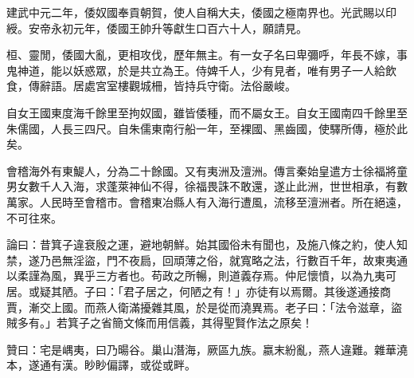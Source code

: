 \begin{pinyinscope}
建武中元二年，倭奴國奉貢朝賀，使人自稱大夫，倭國之極南界也。光武賜以印綬。安帝永初元年，倭國王帥升等獻生口百六十人，願請見。

桓、靈閒，倭國大亂，更相攻伐，歷年無主。有一女子名曰卑彌呼，年長不嫁，事鬼神道，能以妖惑眾，於是共立為王。侍婢千人，少有見者，唯有男子一人給飲食，傳辭語。居處宮室樓觀城柵，皆持兵守衛。法俗嚴峻。

自女王國東度海千餘里至拘奴國，雖皆倭種，而不屬女王。自女王國南四千餘里至朱儒國，人長三四尺。自朱儒東南行船一年，至裸國、黑齒國，使驛所傳，極於此矣。

會稽海外有東鯷人，分為二十餘國。又有夷洲及澶洲。傳言秦始皇遣方士徐福將童男女數千人入海，求蓬萊神仙不得，徐福畏誅不敢還，遂止此洲，世世相承，有數萬家。人民時至會稽市。會稽東冶縣人有入海行遭風，流移至澶洲者。所在絕遠，不可往來。

論曰：昔箕子違衰殷之運，避地朝鮮。始其國俗未有聞也，及施八條之約，使人知禁，遂乃邑無淫盜，門不夜扃，回頑薄之俗，就寬略之法，行數百千年，故東夷通以柔謹為風，異乎三方者也。苟政之所暢，則道義存焉。仲尼懷憤，以為九夷可居。或疑其陋。子曰：「君子居之，何陋之有！」亦徒有以焉爾。其後遂通接商賈，漸交上國。而燕人衛滿擾雜其風，於是從而澆異焉。老子曰：「法令滋章，盜賊多有。」若箕子之省簡文條而用信義，其得聖賢作法之原矣！

贊曰：宅是嵎夷，曰乃暘谷。巢山潛海，厥區九族。嬴末紛亂，燕人違難。雜華澆本，遂通有漢。眇眇偏譯，或從或畔。


\end{pinyinscope}